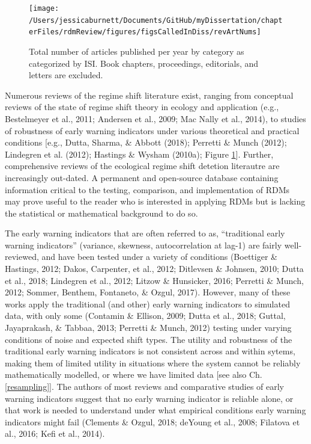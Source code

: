\documentclass[12pt,twoside,openany]{reedthesis}
\begin{document}
\begin{figure}
\texttt{[image: /Users/jessicaburnett/Documents/GitHub/myDissertation/chapterFiles/rdmReview/figures/figsCalledInDiss/revArtNums]} \caption{Total number of articles published per year by category as categorized by ISI. Book chapters, proceedings, editorials, and letters are excluded.}\label{fig:revArtNums}
\end{figure}
Numerous reviews of the regime shift literature exist, ranging from conceptual reviews of the state of regime shift theory in ecology and application (e.g., Bestelmeyer et al., 2011; Andersen et al., 2009; Mac Nally et al., 2014), to studies of robustness of early warning indicators under various theoretical and practical conditions {[}e.g., Dutta, Sharma, \& Abbott (2018); Perretti \& Munch (2012); Lindegren et al. (2012); Hastings \& Wysham (2010a); Figure \ref{fig:revArtNums}{]}. Further, comprehensive reviews of the ecological regime shift detetion literautre are increasingly out-dated. A permanent and open-source database containing information critical to the testing, comparison, and implementation of RDMs may prove useful to the reader who is interested in applying RDMs but is lacking the statistical or mathematical background to do so.

The early warning indicators that are often referred to as, ``traditional early warning indicators'' (variance, skewness, autocorrelation at lag-1) are fairly well-reviewed, and have been tested under a variety of conditions (Boettiger \& Hastings, 2012; Dakos, Carpenter, et al., 2012; Ditlevsen \& Johnsen, 2010; Dutta et al., 2018; Lindegren et al., 2012; Litzow \& Hunsicker, 2016; Perretti \& Munch, 2012; Sommer, Benthem, Fontaneto, \& Ozgul, 2017). However, many of these works apply the traditional (and other) early warning indicators to simulated data, with only some (Contamin \& Ellison, 2009; Dutta et al., 2018; Guttal, Jayaprakash, \& Tabbaa, 2013; Perretti \& Munch, 2012) testing under varying conditions of noise and expected shift types. The utility and robustness of the traditional early warning indicators is not consistent across and within sytems, making them of limited utility in situations where the system cannot be reliably mathematically modelled, or where we have limited data {[}see also Ch. \ref{resampling}{]}. The authors of most reviews and comparative studies of early warning indicators suggest that no early warning indicator is reliable alone, or that work is needed to understand under what empirical conditions early warning indicators might fail (Clements \& Ozgul, 2018; deYoung et al., 2008; Filatova et al., 2016; Kefi et al., 2014).
\end{document}
